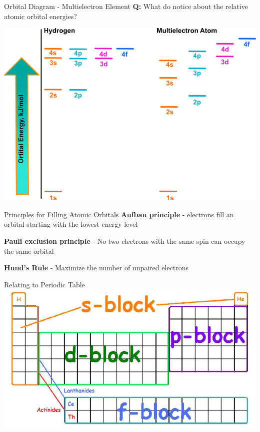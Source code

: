 \documentclass[11pt]{beamer}
\begin{document}
\begin{frame}{Orbital Diagram - Multielectron Element}
  \textbf{Q:} What do notice about the relative atomic orbital energies?
  
  \centering
  \includegraphics[scale=1.3]{orbital_energy}
\end{frame}

\begin{frame}{Principles for Filling Atomic Orbitals}
  \textbf{Aufbau principle} - electrons fill an orbital starting with
  the lowest energy level

  \textbf{Pauli exclusion principle} - No two electrons with the same
  spin can occupy the same orbital

  \textbf{Hund's Rule} - Maximize the number of unpaired electrons
\end{frame}

\begin{frame}{Relating to Periodic Table}
  \centering
  \includegraphics[width=\linewidth]{spdf_orbitals}
\end{frame}
\end{document}
